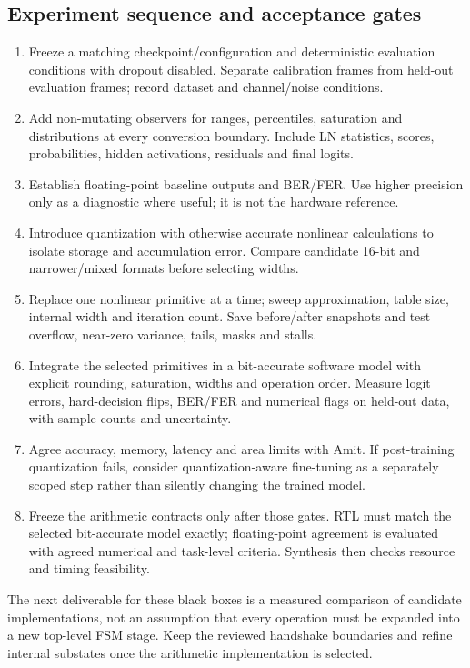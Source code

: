 \subsection{Experiment sequence and acceptance gates}
\begin{enumerate}
\item Freeze a matching checkpoint/configuration and deterministic evaluation conditions with dropout disabled. Separate calibration frames from held-out evaluation frames; record dataset and channel/noise conditions.
\item Add non-mutating observers for ranges, percentiles, saturation and distributions at every conversion boundary. Include LN statistics, scores, probabilities, hidden activations, residuals and final logits.
\item Establish floating-point baseline outputs and BER/FER. Use higher precision only as a diagnostic where useful; it is not the hardware reference.
\item Introduce quantization with otherwise accurate nonlinear calculations to isolate storage and accumulation error. Compare candidate 16-bit and narrower/mixed formats before selecting widths.
\item Replace one nonlinear primitive at a time; sweep approximation, table size, internal width and iteration count. Save before/after snapshots and test overflow, near-zero variance, tails, masks and stalls.
\item Integrate the selected primitives in a bit-accurate software model with explicit rounding, saturation, widths and operation order. Measure logit errors, hard-decision flips, BER/FER and numerical flags on held-out data, with sample counts and uncertainty.
\item Agree accuracy, memory, latency and area limits with Amit. If post-training quantization fails, consider quantization-aware fine-tuning as a separately scoped step rather than silently changing the trained model.
\item Freeze the arithmetic contracts only after those gates. RTL must match the selected bit-accurate model exactly; floating-point agreement is evaluated with agreed numerical and task-level criteria. Synthesis then checks resource and timing feasibility.
\end{enumerate}
The next deliverable for these black boxes is a measured comparison of candidate implementations, not an assumption that every operation must be expanded into a new top-level FSM stage. Keep the reviewed handshake boundaries and refine internal substates once the arithmetic implementation is selected.
